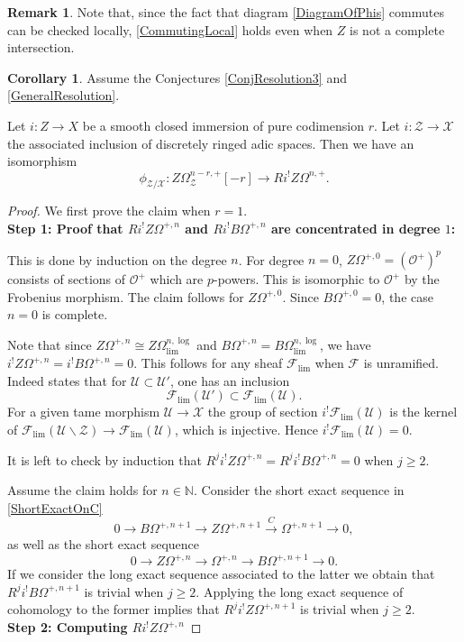 \documentclass{amsart}
\theoremstyle{definition}
\newtheorem{remark}[theorem]{Remark}
\newtheorem{corollary}[theorem]{Corollary}
\numberwithin{equation}{section}
\begin{document}
\begin{remark}
	Note that, since the fact that diagram \eqref{DiagramOfPhis} commutes can be checked locally, \cref{CommutingLocal} holds even when $Z$ is not a complete intersection.
\end{remark}
\begin{corollary}\label{ValueOfRi!ZOmega}
	Assume the Conjectures \ref{ConjResolution3} and \ref{GeneralResolution}. 
	
	Let $i:Z\to X$ be a smooth closed immersion of pure codimension $r$. Let $i:\mathcal{Z}\to \mathcal{X}$ the associated inclusion of discretely ringed adic spaces. Then we have an isomorphism
	\[
	\phi_{\mathcal{Z}/\mathcal{X}}:Z\Omega^{n-r,+}_{\mathcal{Z}}[-r]\to R i^! Z\Omega^{n,+}  .
	\]
\end{corollary}
\begin{proof}
	We first prove the claim when \underline{$r=1$}. \\
	\textbf{Step 1: Proof that $Ri^! Z\Omega^{+,n}$ and $Ri^!B\Omega^{+,n}$ are concentrated in degree $1$:} 
	
	This is done by induction on  the degree $n$. For degree $n=0$, $Z\Omega^{+,0}=(\mathcal{O}^{+})^p$ consists of sections of $\mathcal{O}^+$ which are $p$-powers. This is isomorphic to $\mathcal{O}^+$ by the Frobenius morphism. The claim follows for $Z\Omega^{+,0}$. Since $B\Omega^{+,0}=0$, the case $n=0$ is complete.
	
	Note that since $Z\Omega^{+,n}\cong Z\Omega^{n,\log}_{\lim}$ and $B\Omega^{+,n}=B\Omega^{n,\log}_{\lim}$, we have $i^!Z\Omega^{+,n}=i^!B\Omega^{+,n}=0$. This follows for any sheaf $\mathcal{F}_{\lim}$ when $\mathcal{F}$ is unramified. Indeed \cite[Lemma 8.8]{LogDiff} states that for $\mathcal{U}\subset \mathcal{U}'$, one has an inclusion
	\[
	\mathcal{F}_{\lim}(\mathcal{U}')\subset \mathcal{F}_{\lim}(\mathcal{U}).
	\]
	For a given tame morphism $\mathcal{U}\to \mathcal{X}$ the group of section $i^!\mathcal{F}_{\lim}(\mathcal{U})$ is the kernel of $\mathcal{F}_{\lim}(\mathcal{U}\backslash\mathcal{Z})\to \mathcal{F}_{\lim}(\mathcal{U})$, which is injective. Hence $i^!\mathcal{F}_{\lim}(\mathcal{U})=0$.
	
	
	 It is left to check by induction that $R^{j}i^!Z\Omega^{+,n}=R^ji^!B\Omega^{+,n}=0$ when $j\geq 2$.
	
	Assume the claim holds for $n\in \mathbb{N}$. Consider the short exact sequence in \cref{ShortExactOnC}
	\[
	0\to B\Omega^{+,n+1}\to Z\Omega^{+,n+1}\xrightarrow{C} \Omega^{+,n+1}\to 0,
	\]
	as well as the short exact sequence 
	\[
	0\to Z\Omega^{+,n}\to \Omega^{+,n}\to B\Omega^{+,n+1}\to 0.
	\]
	If we consider the long exact sequence associated to the latter we obtain  that $R^ji^! B\Omega^{+,n+1}$ is trivial when $j\geq 2$. Applying the long exact sequence of cohomology to the former implies that $R^ji^!Z\Omega^{+,n+1}$ is trivial when $j\geq 2$.\\	
	\textbf{Step 2: Computing $Ri^!Z\Omega^{+,n}$} 
	

\end{proof}
\end{document}

